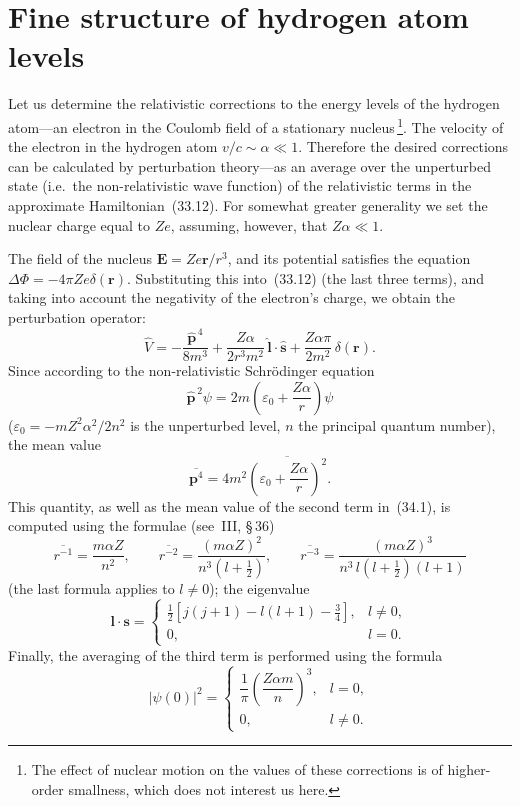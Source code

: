 \section{Fine structure of hydrogen atom levels}

Let us determine the relativistic corrections to the energy levels of the hydrogen atom---an electron in the Coulomb field of a stationary nucleus\,\footnote{The effect of nuclear motion on the values of these corrections is of higher-order smallness, which does not interest us here.}. The velocity of the electron in the hydrogen atom $v/c \sim \alpha \ll 1$. Therefore the desired corrections can be calculated by perturbation theory---as an average over the unperturbed state (i.e.\ the non-relativistic wave function) of the relativistic terms in the approximate Hamiltonian~(33.12). For somewhat greater generality we set the nuclear charge equal to $Ze$, assuming, however, that $Z\alpha \ll 1$.

The field of the nucleus $\mathbf{E} = Ze\mathbf{r}/r^3$, and its potential satisfies the equation $\Delta\Phi = -4\pi Ze\delta(\mathbf{r})$. Substituting this into~(33.12) (the last three terms), and taking into account the negativity of the electron's charge, we obtain the perturbation operator:
\begin{equation}
\widehat V = -\frac{\widehat{\mathbf{p}}^{\,4}}{8m^3} + \frac{Z\alpha}{2r^3m^2}\,\widehat{\mathbf{l}}\cdot\widehat{\mathbf{s}} + \frac{Z\alpha\pi}{2m^2}\,\delta(\mathbf{r}).
\tag{34.1}
\end{equation}
Since according to the non-relativistic Schr\"odinger equation
\[
\widehat{\mathbf{p}}^{\,2}\psi = 2m\!\left(\varepsilon_0 + \frac{Z\alpha}{r}\right)\!\psi
\]
($\varepsilon_0 = -mZ^2\alpha^2/2n^2$ is the unperturbed level, $n$ the principal quantum number), the mean value
\[
\overline{\mathbf{p}^4} = 4m^2\overline{\!\left(\varepsilon_0 + \frac{Z\alpha}{r}\right)^{\!2}}.
\]
This quantity, as well as the mean value of the second term in~(34.1), is computed using the formulae (see~III, \S\,36)
\begin{equation}
\overline{r^{-1}} = \frac{m\alpha Z}{n^2},\qquad \overline{r^{-2}} = \frac{(m\alpha Z)^2}{n^3(l+\tfrac{1}{2})},\qquad \overline{r^{-3}} = \frac{(m\alpha Z)^3}{n^3\,l(l+\tfrac{1}{2})(l+1)}
\tag{34.2}
\end{equation}
(the last formula applies to $l \neq 0$); the eigenvalue
\[
\mathbf{l}\cdot\mathbf{s} =
\begin{cases}
\tfrac{1}{2}[j(j+1) - l(l+1) - \tfrac{3}{4}], & l \neq 0,\\
0, & l = 0.
\end{cases}
\]
Finally, the averaging of the third term is performed using the formula
\begin{equation}
|\psi(0)|^2 =
\begin{cases}
\dfrac{1}{\pi}\!\left(\dfrac{Z\alpha m}{n}\right)^{\!3}, & l = 0,\\[6pt]
0, & l \neq 0.
\end{cases}
\tag{34.3}
\end{equation}

